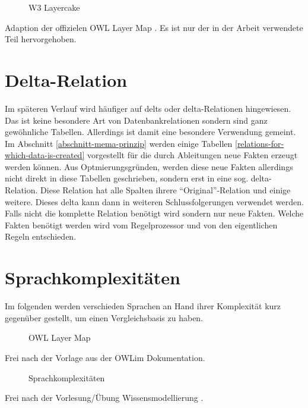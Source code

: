 \begin{figure}[htp]
	\caption{W3 Layercake}
	\label{image-w3-layercake}
	\begin{center}
	\end{center}
\end{figure}

Adaption der offizielen OWL Layer Map \cite{OWLLayerMap}. Es ist nur der in der Arbeit verwendete Teil hervorgehoben.

\section{Delta-Relation}
Im späteren Verlauf wird häufiger auf delts oder delta-Relationen hingewiesen. Das ist keine besondere Art von Datenbankrelationen sondern sind ganz gewöhnliche Tabellen. Allerdings ist damit eine besondere Verwendung gemeint. Im Abschnitt \ref{abschnitt-mema-prinzip} werden einige Tabellen \ref{relations-for-which-data-is-created} vorgestellt für die durch Ableitungen neue Fakten erzeugt werden können. Aus Optmierungsgründen, werden diese neue Fakten allerdings nicht direkt in diese Tabellen geschrieben, sondern erst in eine sog. delta-Relation. Diese Relation hat alle Spalten ihrere ``Original''-Relation und einige weitere. Dieses delta kann dann in weiteren Schlussfolgerungen verwendet werden. Falls nicht die komplette Relation benötigt wird sondern nur neue Fakten. Welche Fakten benötigt werden wird vom Regelprozessor und von den eigentlichen Regeln entschieden.

\section{Sprachkomplexitäten}
Im folgenden werden verschieden Sprachen an Hand ihrer Komplexität kurz gegenüber gestellt, um einen Vergleichsbasis zu haben.

\begin{figure}[htp]
	\caption{OWL Layer Map}
	\label{image-owl-layer-map}
	\begin{center}
	\end{center}
\end{figure}
Frei nach der Vorlage aus der OWLim Dokumentation.

\begin{figure}[htp]
	\caption{Sprachkomplexitäten}
	\label{image-sprachhierarchie}
	\begin{center}
    
    \end{center}
\end{figure}
Frei nach der Vorlesung/Übung Wissensmodellierung \cite{vonHenke2009}.

